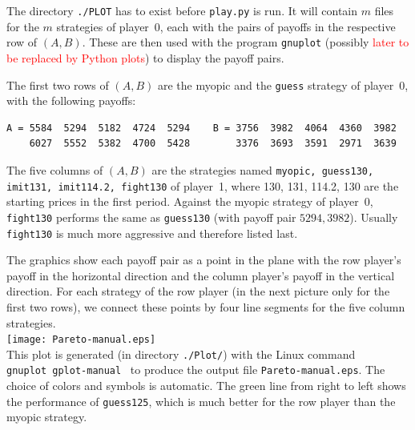 \documentclass[a4paper,12pt]{article}  %
\def\R{\textcolor{red}}
\theoremstyle{definition}
\begin{document}
The directory {\tt ./PLOT} has to exist before {\tt play.py}
is run.
It will contain $m$ files for the $m$ strategies of
player~0, each with the pairs of payoffs in the respective
row of $(A,B)$.
These are then used with the program {\tt gnuplot}
(possibly \R{later to be replaced by Python plots}) to
display the payoff pairs.

The first two rows of $(A,B)$
are the myopic and the {\tt guess} strategy of player~0,
with the following payoffs:
\begin{verbatim}
A = 5584  5294  5182  4724  5294    B = 3756  3982  4064  4360  3982 
    6027  5552  5382  4700  5428        3376  3693  3591  2971  3639 
\end{verbatim}
The five columns of $(A,B)$ are the strategies named
{\tt myopic, guess130, imit131, imit114.2, fight130}
of player~1, where 130, 131, 114.2, 130 are the starting
prices in the first period.
Against the myopic strategy of player~0, {\tt fight130}
performs the same as {\tt guess130} (with payoff pair
$5294,3982$).
Usually {\tt fight130} is much more aggressive and therefore
listed last.

The graphics show each payoff pair as a point in the plane
with the row player's payoff in the horizontal direction and
the column player's payoff in the vertical direction.
For each strategy of the row player (in the next picture
only for the first two rows), we connect these points by
four line segments for the five column strategies.
\\
\texttt{[image: Pareto-manual.eps]}
\\
This plot is generated (in directory {\tt ./Plot/})
with the Linux command 
\\
{\tt gnuplot gplot-manual} \
to produce the output file {\tt Pareto-manual.eps}.
The choice of colors and symbols is automatic.
The green line from right to left shows the performance of
{\tt guess125}, which is much better for the row player than
the myopic strategy.
\end{document}
